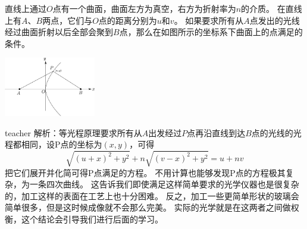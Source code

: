 \begin{example}
直线上通过$O$点有一个曲面，曲面左方为真空，右方为折射率为$n$的介质。
在直线上有$A$、$B$两点，它们与$O$点的距离分别为$u$和$v$。
如果要求所有从$A$点发出的光线经过曲面折射以后全部会聚到$B$点，那么在如图所示的坐标系下曲面上的点满足的条件。

\includegraphics[width=0.3\textwidth]{images/fermat-refraction-solution.pdf}

\begin{taggedblock}{teacher}
\noindent
解析：等光程原理要求所有从$A$出发经过$P$点再沿直线到达$B$点的光线的光程都相同，设P点的坐标为$(x,y)$，可得
\[
\sqrt{(u+x)^2+y^2}+n\sqrt{(v-x)^2+y^2}=u+nv
\]
把它们展开并化简可得P点满足的方程。
不用计算也能够发现P点的方程极其复杂，为一条四次曲线。
这告诉我们即使满足这样简单要求的光学仪器也是很复杂的，加工这样的表面在工艺上也十分困难。
反之，加工一些更简单形状的玻璃会简单很多，但是这时候成像就不会那么完美。
实际的光学就是在这两者之间做权衡，这个结论会引导我们进行后面的学习。
\end{taggedblock}
\end{example}



